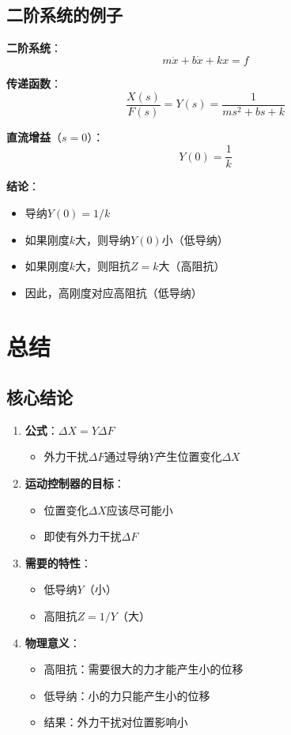 \documentclass[12pt,a4paper]{article}
\begin{document}
\subsection{二阶系统的例子}

\textbf{二阶系统}：
\begin{equation}
m\ddot{x} + b\dot{x} + kx = f
\end{equation}

\textbf{传递函数}：
\begin{equation}
\frac{X(s)}{F(s)} = Y(s) = \frac{1}{ms^2 + bs + k}
\end{equation}

\textbf{直流增益}（$s = 0$）：
\begin{equation}
Y(0) = \frac{1}{k}
\end{equation}

\textbf{结论}：
\begin{itemize}
\item 导纳$Y(0) = 1/k$
\item 如果刚度$k$大，则导纳$Y(0)$小（低导纳）
\item 如果刚度$k$大，则阻抗$Z = k$大（高阻抗）
\item 因此，高刚度对应高阻抗（低导纳）
\end{itemize}

\section{总结}

\subsection{核心结论}

\begin{enumerate}
\item \textbf{公式}：$\Delta X = Y \Delta F$
\begin{itemize}
\item 外力干扰$\Delta F$通过导纳$Y$产生位置变化$\Delta X$
\end{itemize}

\item \textbf{运动控制器的目标}：
\begin{itemize}
\item 位置变化$\Delta X$应该尽可能小
\item 即使有外力干扰$\Delta F$
\end{itemize}

\item \textbf{需要的特性}：
\begin{itemize}
\item 低导纳$Y$（小）
\item 高阻抗$Z = 1/Y$（大）
\end{itemize}

\item \textbf{物理意义}：
\begin{itemize}
\item 高阻抗：需要很大的力才能产生小的位移
\item 低导纳：小的力只能产生小的位移
\item 结果：外力干扰对位置影响小
\end{itemize}
\end{enumerate}
\end{document}
